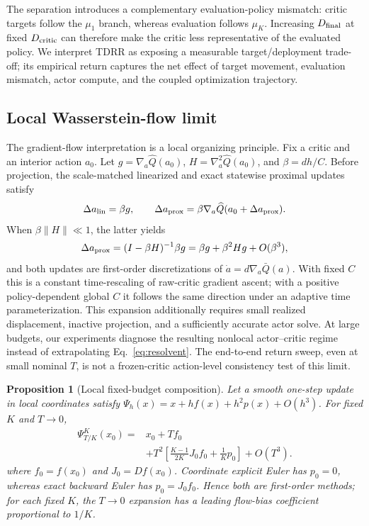 \documentclass[letterpaper]{article}
\newtheorem{proposition}{Proposition}
\begin{document}
The separation introduces a complementary evaluation-policy mismatch: critic
targets follow the $\mu_1$ branch, whereas evaluation follows $\mu_K$.
Increasing $D_{\rm final}$ at fixed $D_{\rm critic}$ can therefore make the
critic less representative of the evaluated policy. We interpret TDRR as
exposing a measurable target/deployment trade-off; its empirical return
captures the net effect of target movement, evaluation mismatch, actor compute,
and the coupled optimization trajectory.

\subsection{Local Wasserstein-flow limit}
\label{sec:local_limit}

The gradient-flow interpretation is a local organizing principle. Fix a critic
and an interior action $a_0$. Let $g=\nabla_a\widehat Q(a_0)$,
$H=\nabla_a^2\widehat Q(a_0)$, and $\beta=dh/C$. Before projection, the
scale-matched linearized and exact statewise proximal updates satisfy
\begin{equation}
\Delta a_{\rm lin}=\beta g,
\qquad
\Delta a_{\rm prox}=\beta\nabla_a\widehat Q(a_0+\Delta a_{\rm prox}).
\label{eq:local_steps}
\end{equation}
When $\beta\|H\|\ll1$, the latter yields
\begin{equation}
\Delta a_{\rm prox}=(I-\beta H)^{-1}\beta g
=\beta g+\beta^2Hg+O(\beta^3),
\label{eq:resolvent}
\end{equation}
and both updates are first-order discretizations of
$\dot a=d\nabla_a\bar Q(a)$. With fixed $C$ this is a constant
time-rescaling of raw-critic gradient ascent; with a positive policy-dependent
global $C$ it follows the same direction under an adaptive time
parameterization. This expansion additionally requires small realized
displacement, inactive projection, and a sufficiently accurate actor solve.
At large budgets, our experiments diagnose the resulting nonlocal
actor--critic regime instead of extrapolating Eq.~\eqref{eq:resolvent}. The
end-to-end return sweep, even at small nominal $T$, is not a frozen-critic
action-level consistency test of this limit.

\begin{proposition}[Local fixed-budget composition]
\label{prop:local_composition}
Let a smooth one-step update in local coordinates satisfy
$\Psi_h(x)=x+h f(x)+h^2p(x)+O(h^3)$. For fixed $K$ and $T\rightarrow0$,
\begin{equation}
\begin{aligned}
\Psi_{T/K}^{K}(x_0)
={}&x_0+Tf_0\\
&+T^2\!\left[\frac{K-1}{2K}J_0f_0+\frac{1}{K}p_0\right]
+O(T^3).
\end{aligned}
\label{eq:k_comp}
\end{equation}
where $f_0=f(x_0)$ and $J_0=Df(x_0)$. Coordinate explicit Euler has
$p_0=0$, whereas exact backward Euler has $p_0=J_0f_0$. Hence both are
first-order methods; for each fixed $K$, the $T\to0$ expansion has a leading
flow-bias coefficient proportional to $1/K$.
\end{proposition}
\end{document}
